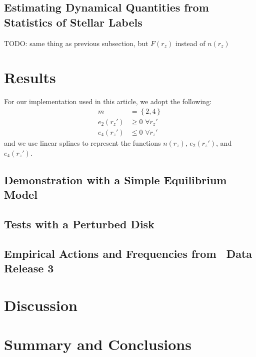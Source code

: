 \subsection{Estimating Dynamical Quantities from Statistics of Stellar Labels}

TODO: same thing as previous subsection, but $F(r_z)$ instead of $n(r_z)$


\section{Results} \label{sec:results}

For our implementation used in this article, we adopt the following:
\begin{align}
    m &= \left\{2, 4\right\} \\
    e_2(r_z') &\geq 0 \,\,\forall r_z'\\
    e_4(r_z') &\leq 0 \,\,\forall r_z'
\end{align}
and we use linear splines to represent the functions $n(r_z)$, $e_2(r_z')$, and
$e_4(r_z')$.


\subsection{Demonstration with a Simple Equilibrium Model}
\label{sec:eq-model}


\subsection{Tests with a Perturbed Disk}
\label{sec:diseq-disk}


\subsection{Empirical Actions and Frequencies from \gaia\ Data Release 3}
\label{sec:gaiadr3}


\section{Discussion} \label{sec:discussion}


\section{Summary and Conclusions} \label{sec:conclusions}


